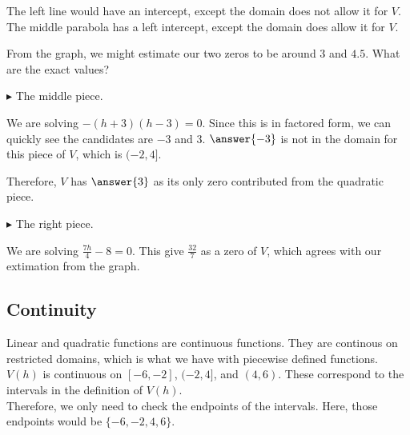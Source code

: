 \documentclass{ximera}
\begin{document}
The left line would have an intercept, except the domain does not allow it for $V$.  The middle parabola has a left intercept, except the domain does allow it for $V$. 

From the graph, we might estimate our two zeros to be around $3$ and $4.5$.  What are the exact values?







$\blacktriangleright$ The middle piece. 


\begin{explanation}


We are solving $-(h+3)(h-3) = 0$.  Since this is in factored form, we can quickly see the candidates are $-3$ and $3$.  $\answer{-3}$ is not in the domain for this piece of $V$, which is $(-2, 4]$.

Therefore, $V$ has $\answer{3}$ as its only zero contributed from the quadratic piece.
\end{explanation}



$\blacktriangleright$ The right piece. 


\begin{explanation}


We are solving $\frac{7h}{4} - 8 = 0$.  This give $\frac{32}{7}$ as a zero of $V$, which agrees with our extimation from the graph.

\end{explanation}













\subsection*{Continuity} 


Linear and quadratic functions are continuous functions. They are continous on restricted domains, which is what we have with piecewise defined functions.  $V(h)$ is continuous on $[-6, -2]$, $(-2, 4]$, and $(4, 6)$.  These correspond to the intervals in the definition of $V(h)$. \\

Therefore, we only need to check the endpoints of the intervals.  Here, those endpoints would be $\{ -6, -2, 4, 6 \}$.
\end{document}

